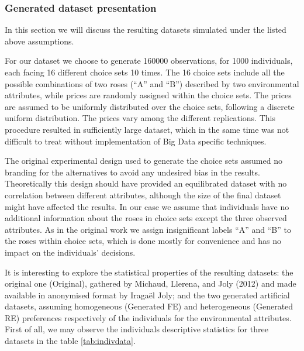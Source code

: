 \documentclass[11pt,]{article}
\begin{document}
\FloatBarrier

\hypertarget{generated-dataset-presentation}{%
\subsubsection{Generated dataset
presentation}\label{generated-dataset-presentation}}

\FloatBarrier

In this section we will discuss the resulting datasets simulated under
the listed above assumptions.

For our dataset we choose to generate 160000 observations, for 1000
individuals, each facing 16 different choice sets 10 times. The 16
choice sets include all the possible combinations of two roses (``A''
and ``B'') described by two environmental attributes, while prices are
randomly assigned within the choice sets. The prices are assumed to be
uniformly distributed over the choice sets, following a discrete uniform
distribution. The prices vary among the different replications. This
procedure resulted in sufficiently large dataset, which in the same time
was not difficult to treat without implementation of Big Data specific
techniques.

The original experimental design used to generate the choice sets
assumed no branding for the alternatives to avoid any undesired bias in
the results. Theoretically this design should have provided an
equilibrated dataset with no correlation between different attributes,
although the size of the final dataset might have affected the results.
In our case we assume that individuals have no additional information
about the roses in choice sets except the three observed attributes. As
in the original work we assign insignificant labels ``A'' and ``B'' to
the roses within choice sets, which is done mostly for convenience and
has no impact on the individuals' decisions.

It is interesting to explore the statistical properties of the resulting
datasets: the original one (Original), gathered by Michaud, Llerena, and
Joly (2012) and made available in anonymised format by Iragaël Joly; and
the two generated artificial datasets, assuming homogeneous (Generated
FE) and heterogeneous (Generated RE) preferences respectively of the
individuals for the environmental attributes. First of all, we may
observe the individuals descriptive statistics for three datasets in the
table \ref{tab:indivdata}.
\end{document}
